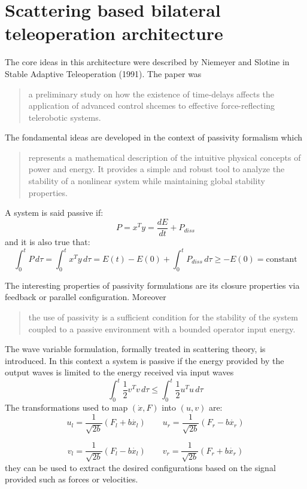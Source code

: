 \documentclass[a4paper,12pt]{article}
\begin{document}
\section{Scattering based bilateral teleoperation architecture}
The core ideas in this architecture were described by Niemeyer and Slotine in Stable Adaptive Teleoperation (1991). The paper was \begin{quote}
    a preliminary study on how the existence of time-delays affects the application of advanced control shcemes to effective force-reflecting telerobotic systems.
\end{quote}

The fondamental ideas are developed in the context of passivity formalism which
\begin{quote}
    represents a mathematical description of the intuitive physical concepts of power and energy. It provides a simple and robust tool to analyze the stability of a nonlinear system while maintaining global stability properties.
\end{quote}
A system is said passive if:
\[
    P = x^Ty = \frac{dE}{dt} + P_{diss}
\]
and it is also true that:
\[
    \int_{0}^{t} P \,d\tau = \int_{0}^{t} x^Ty \,d\tau = E(t) - E(0) + \int_{0}^{t} P_{diss} \,d\tau \geq -E(0) = \text{constant}
\]

\noindent The interesting properties of passivity formulations are its closure properties via feedback or parallel configuration. Moreover 

\begin{quote}
    the use of passivity is a sufficient condition for the stability of the system coupled to a passive environment with a bounded operator input energy.
\end{quote}

\noindent The wave variable formulation, formally treated in scattering theory, is introduced. In this context a system is passive if the energy provided by the output waves is limited to the energy received via input waves
\[
    \int_{0}^{t} \frac{1}{2}v^Tv \,d\tau \leq \int_{0}^{t} \frac{1}{2}u^Tu \,d\tau 
\]
The transformations used to map $(\dot{x},F)$ into $(u,v)$ are:
\[
    u_l = \frac{1}{\sqrt{2b}}(F_l + b \dot{x_l}) \qquad u_r = \frac{1}{\sqrt{2b}}(F_r - b \dot{x_r}) 
\]

\[
    v_l = \frac{1}{\sqrt{2b}}(F_l - b \dot{x_l}) \qquad v_r = \frac{1}{\sqrt{2b}}(F_r + b \dot{x_r}) 
\]
they can be used to extract the desired configurations based on the signal provided such as forces or velocities.
\end{document}
